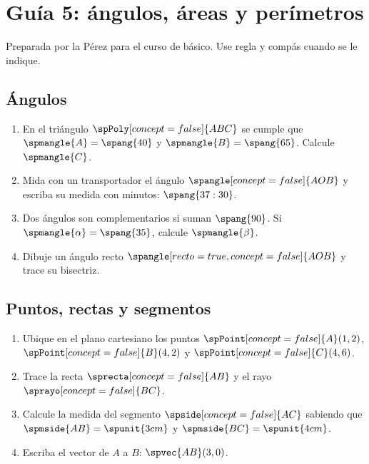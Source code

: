 \documentclass{article}
\begin{document}
\section*{Guía  5: ángulos, áreas y perímetros}

Preparada por la  Pérez para el curso de  básico.
Use regla y compás cuando se le indique.

\subsection*{Ángulos}

\begin{enumerate}
  \item En el triángulo $\spPoly[concept=false]{ABC}$ se cumple que $\spmangle{A} = \spang{40}$ y $\spmangle{B} = \spang{65}$. Calcule $\spmangle{C}$.
  \item Mida con un transportador el ángulo $\spangle[concept=false]{AOB}$ y escriba su medida con minutos: $\spang{37:30}$.
  \item Dos ángulos son complementarios si suman $\spang{90}$. Si $\spmangle{\alpha} = \spang{35}$, calcule $\spmangle{\beta}$.
  \item Dibuje un ángulo recto $\spangle[recto=true,concept=false]{AOB}$ y trace su bisectriz.
\end{enumerate}

\subsection*{Puntos, rectas y segmentos}

\begin{enumerate}
  \item Ubique en el plano cartesiano los puntos $\spPoint[concept=false]{A}(1,2)$, $\spPoint[concept=false]{B}(4,2)$ y $\spPoint[concept=false]{C}(4,6)$.
  \item Trace la recta $\sprecta[concept=false]{AB}$ y el rayo $\sprayo[concept=false]{BC}$.
  \item Calcule la medida del segmento $\spside[concept=false]{AC}$ sabiendo que $\spmside{AB} = \spunit{3 cm}$ y $\spmside{BC} = \spunit{4 cm}$.
  \item Escriba el vector de $A$ a $B$: $\spvec{AB}(3,0)$.
\end{enumerate}
\end{document}
